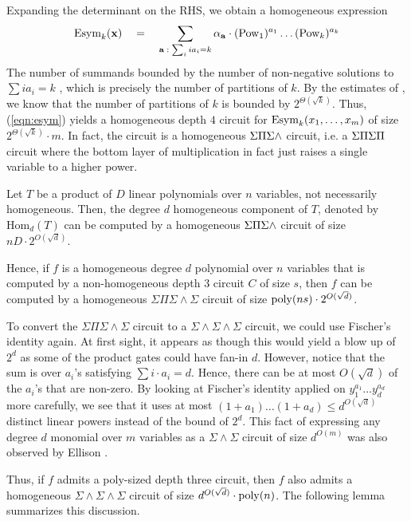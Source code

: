 Expanding the determinant on the RHS, we obtain a homogeneous expression
\begin{equation}\label{eqn:esym}
\mathrm{Esym}_k(\mathbf{x}) \quad = \quad \sum_{\mathbf{a}\;:\; \sum_i ia_i = k} \alpha_{\mathbf{a}} \cdot (\mathrm{Pow}_1)^{a_1}\dots (\mathrm{Pow}_k)^{a_k}
\end{equation}
The number of summands bounded by the number of non-negative solutions to $\sum i a_i = k$ , which is precisely the number of partitions of $k$. By the estimates of \cite{hr18}, we know that the number of partitions of $k$ is bounded by $2^{\Theta(\sqrt{k})}$. Thus, (\ref{eqn:esym}) yields a homogeneous depth $4$ circuit for $\mathrm{Esym}_k(x_1,\dots, x_m)$ of size $2^{\Theta(\sqrt{k})} \cdot m$. In fact, the circuit is a homogeneous $\Sigma\Pi\Sigma\wedge$ circuit, i.e. a $\Sigma\Pi\Sigma\Pi$ circuit where the bottom layer of multiplication in fact just raises a single variable to a higher power. 

\begin{corollary}\label{cor:d3-d5}
Let $T$ be a product of $D$ linear polynomials over $n$ variables, not necessarily homogeneous. Then, the degree $d$ homogeneous component of $T$, denoted by $\mathrm{Hom}_d(T)$ can be computed by a homogeneous $\Sigma\Pi\Sigma\wedge$ circuit of size $nD\cdot 2^{O(\sqrt{d})}$. 

Hence, if $f$ is a homogeneous degree $d$ polynomial over $n$ variables that is computed by a non-homogeneous depth $3$ circuit $C$ of size $s$, then $f$ can be computed by a homogeneous $\Sigma\Pi\Sigma\!\wedge\!\Sigma$ circuit of size $\mathrm{poly}(ns) \cdot 2^{O(\sqrt{d})}$. 
\end{corollary}

To convert the $\Sigma\Pi\Sigma\!\wedge\!\Sigma$ circuit to a $\Sigma\!\wedge\!\Sigma\!\wedge\!\Sigma$ circuit, we could use Fischer's identity again. At first sight, it appears as though this would yield a blow up of $2^d$ as some of the product gates could have fan-in $d$. However, notice that the sum is over $a_i$'s satisfying $\sum i\cdot a_i = d$. Hence, there can be at most $O(\sqrt{d})$ of the $a_i$'s that are non-zero. By looking at Fischer's identity applied on $y_1^{a_1}\dots y_{d}^{a_d}$ more carefully, we see that it uses at most $(1+a_1)\dots (1+a_d) \leq d^{O(\sqrt{d})}$ distinct linear powers instead of the \naive bound of $2^{d}$. This fact of expressing any degree $d$ monomial over $m$ variables as a $\Sigma\!\wedge\!\Sigma$ circuit of size $d^{O(m)}$ was also observed by Ellison \cite{ellison}. 

Thus, if $f$ admits a poly-sized depth three circuit, then $f$ also admits a homogeneous $\Sigma\!\wedge\!\Sigma\!\wedge\!\Sigma$ circuit of size $d^{O(\sqrt{d})} \cdot \mathrm{poly}(n)$. The following lemma summarizes this discussion. 

